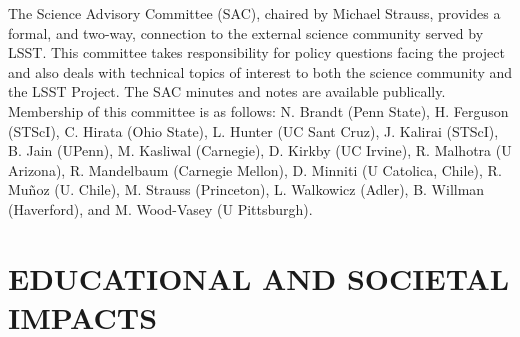 \documentclass{emulateapj}
\begin{document}
The Science Advisory Committee (SAC), chaired by Michael Strauss, provides a formal, and 
two-way, connection to the external science community served by LSST. This committee takes 
responsibility for policy questions facing the project and also deals with technical topics of interest 
to both the science community and the LSST Project. The SAC minutes and notes are available 
publically. Membership of this committee is as follows: N. Brandt
(Penn State), H. Ferguson (STScI), 
C. Hirata (Ohio State), L. Hunter (UC Sant Cruz), J. Kalirai (STScI), B. Jain (UPenn), M. Kasliwal (Carnegie), 
D. Kirkby (UC Irvine), R. Malhotra (U Arizona), R. Mandelbaum
(Carnegie Mellon),
D. Minniti (U Catolica, Chile), R. Mu\~noz (U. Chile), 
M. Strauss (Princeton), L. Walkowicz (Adler), B. Willman (Haverford), and M. Wood-Vasey 
(U Pittsburgh). 



\section{   EDUCATIONAL AND SOCIETAL IMPACTS    }
\label{Sec:impact}
\end{document}
